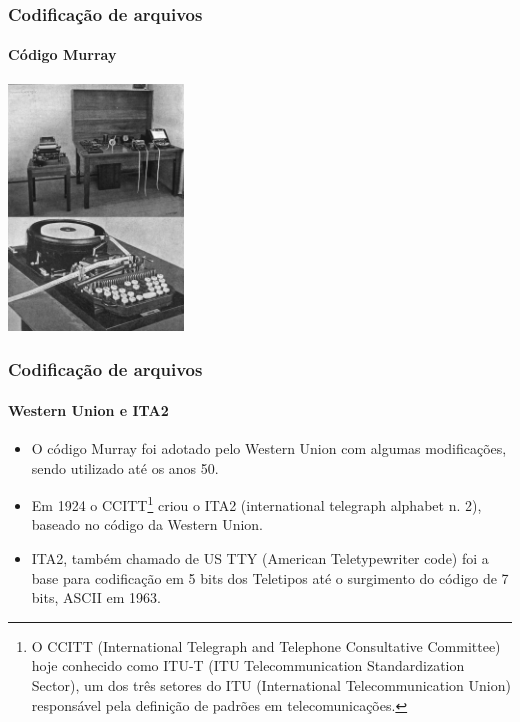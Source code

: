 \begin{frame}
\frametitle{Codificação de arquivos}
\framesubtitle{Código Murray}
        \centering
        \includegraphics[width=0.35\textwidth]{figures/murrayapparatus.jpg} 
\end{frame}


\begin{frame}
\frametitle{Codificação de arquivos}
\framesubtitle{Western Union e ITA2}
   \begin{itemize}
   \item O código Murray foi adotado pelo Western Union com algumas modificações, sendo utilizado até os anos 50.
   \item Em 1924 o CCITT\footnote{O CCITT (International Telegraph and Telephone Consultative Committee) hoje conhecido
                                 como ITU-T (ITU Telecommunication Standardization Sector), um dos três setores do
                                 ITU (International Telecommunication Union) responsável pela definição de padrões em telecomunicações.}
         criou o ITA2 (international telegraph alphabet n. 2), baseado no código da Western Union.
   \item ITA2, também chamado de US TTY (American Teletypewriter code) foi a base para codificação em 5 bits dos Teletipos
         até o surgimento do código de 7 bits, ASCII em 1963.
   \end{itemize}
\end{frame}


